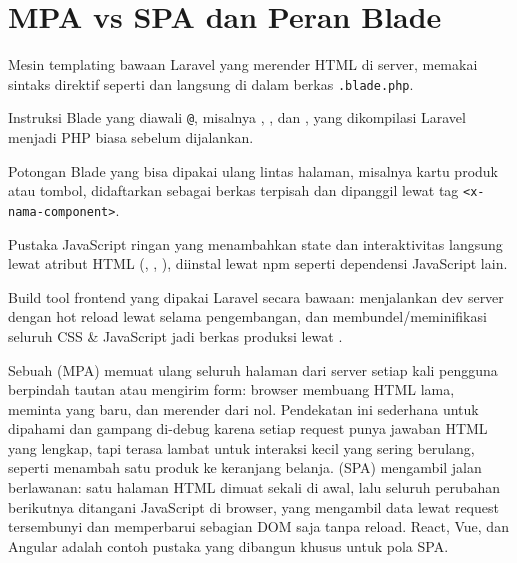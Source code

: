 \section{MPA vs SPA dan Peran Blade}
\label{sec:blade-dan-tailwind-1}

\begin{istilahpenting}
\begin{description}[leftmargin=0pt,style=nextline]
  \item[Blade] Mesin templating bawaan Laravel yang merender HTML di server, memakai sintaks direktif seperti  dan  langsung di dalam berkas \texttt{.blade.php}.
  \item[Directive] Instruksi Blade yang diawali \texttt{@}, misalnya , , dan , yang dikompilasi Laravel menjadi PHP biasa sebelum dijalankan.
  \item[Component] Potongan Blade yang bisa dipakai ulang lintas halaman, misalnya kartu produk atau tombol, didaftarkan sebagai berkas terpisah dan dipanggil lewat tag \texttt{<x-nama-component>}.
  \item[Alpine.js] Pustaka JavaScript ringan yang menambahkan state dan interaktivitas langsung lewat atribut HTML (, , ), diinstal lewat npm seperti dependensi JavaScript lain.
  \item[Vite] Build tool frontend yang dipakai Laravel secara bawaan: menjalankan dev server dengan hot reload lewat  selama pengembangan, dan membundel/meminifikasi seluruh CSS \& JavaScript jadi berkas produksi lewat .
\end{description}
\end{istilahpenting}

Sebuah  (MPA) memuat ulang seluruh halaman dari
server setiap kali pengguna berpindah tautan atau mengirim form: browser
membuang HTML lama, meminta yang baru, dan merender dari nol. Pendekatan ini
sederhana untuk dipahami dan gampang di-debug karena setiap request punya
jawaban HTML yang lengkap, tapi terasa lambat untuk interaksi kecil yang
sering berulang, seperti menambah satu produk ke keranjang belanja.
 (SPA) mengambil jalan berlawanan: satu
halaman HTML dimuat sekali di awal, lalu seluruh perubahan berikutnya
ditangani JavaScript di browser, yang mengambil data lewat request
tersembunyi dan memperbarui sebagian DOM saja tanpa reload. React, Vue, dan
Angular adalah contoh pustaka yang dibangun khusus untuk pola SPA.

